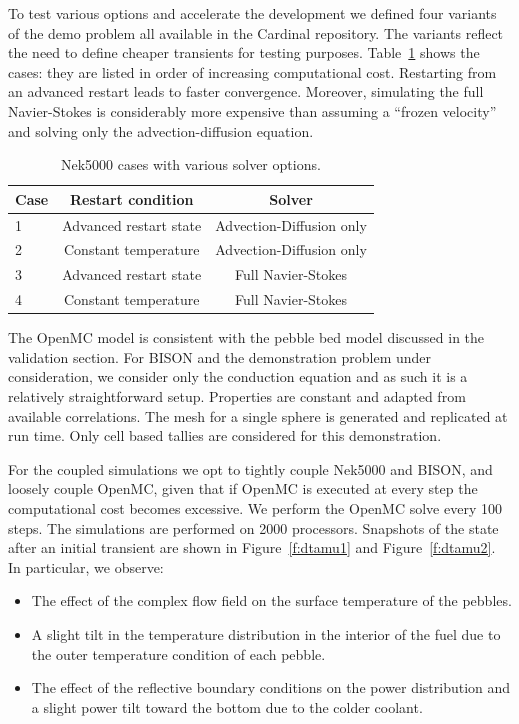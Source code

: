 To test various options and accelerate the development we defined four variants of the demo problem all available in the Cardinal repository. The variants reflect the need to define cheaper transients for testing purposes. Table~\ref{tab:nek} shows the cases: they are listed in order of increasing computational cost. Restarting from an advanced restart leads to faster convergence. Moreover, simulating the full Navier-Stokes is considerably more expensive than assuming a ``frozen velocity'' and solving only the advection-diffusion equation.

\begin{table}
  \centering
  \begin{tabular}{|lcc|}
    \hline \hline
    Case & Restart condition & Solver \\
    \hline
    1 & Advanced restart state & Advection-Diffusion only \\
    2 & Constant temperature   & Advection-Diffusion only \\
    3 & Advanced restart state & Full Navier-Stokes \\
    4 & Constant temperature   & Full Navier-Stokes \\
    \hline \hline
  \end{tabular}
  \caption{Nek5000 cases with various solver options.}
  \label{tab:nek}
\end{table}

The OpenMC model is consistent with the pebble bed model discussed in the validation section. For BISON and the demonstration problem under consideration, we consider only the conduction equation and as such it is a relatively straightforward setup. Properties are constant and adapted from available correlations. The mesh for a single sphere is generated and replicated at run time. Only cell based tallies are considered for this demonstration.

For the coupled simulations we opt to tightly couple Nek5000 and BISON, and loosely couple OpenMC, given that if OpenMC is executed at every step the computational cost becomes excessive. We perform the OpenMC solve every 100 steps. The simulations are performed on 2000 processors. Snapshots of the state after an initial transient are shown in Figure~\ref{f:dtamu1} and Figure~\ref{f:dtamu2}. In particular, we observe:
\begin{itemize}
  \item The effect of the complex flow field on the surface temperature of the pebbles.
  \item A slight tilt in the temperature distribution in the interior of the fuel due to the outer temperature condition of each pebble.
  \item The effect of the reflective boundary conditions on the power distribution and a slight power tilt toward the bottom due to the colder coolant.
\end{itemize}

